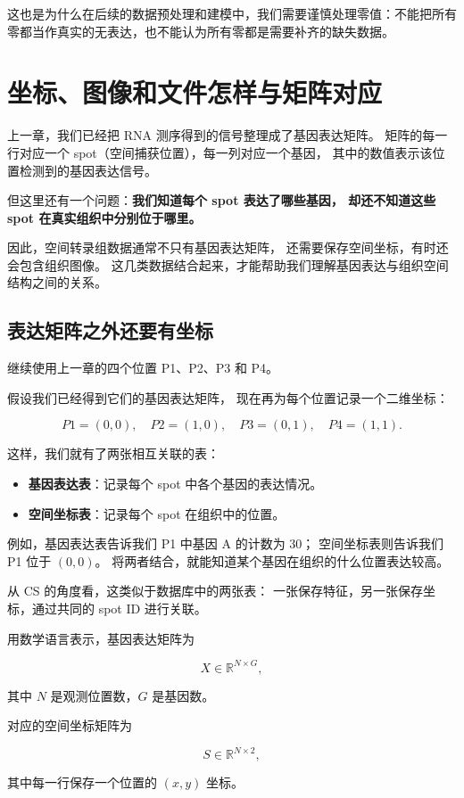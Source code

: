 \documentclass[UTF8,a4paper,11pt,fontset=fandol]{ctexart}
\newcommand{\chapterstart}[1]{\clearpage\section{#1}}
\begin{document}
这也是为什么在后续的数据预处理和建模中，我们需要谨慎处理零值：不能把所有零都当作真实的无表达，也不能认为所有零都是需要补齐的缺失数据。




\clearpage
\endgroup
\chapterstart{坐标、图像和文件怎样与矩阵对应}

上一章，我们已经把 RNA 测序得到的信号整理成了基因表达矩阵。
矩阵的每一行对应一个 spot（空间捕获位置），每一列对应一个基因，
其中的数值表示该位置检测到的基因表达信号。

但这里还有一个问题：\textbf{我们知道每个 spot 表达了哪些基因，
却还不知道这些 spot 在真实组织中分别位于哪里。}

因此，空间转录组数据通常不只有基因表达矩阵，
还需要保存空间坐标，有时还会包含组织图像。
这几类数据结合起来，才能帮助我们理解基因表达与组织空间结构之间的关系。

\subsection{表达矩阵之外还要有坐标}

继续使用上一章的四个位置 P1、P2、P3 和 P4。

假设我们已经得到它们的基因表达矩阵，
现在再为每个位置记录一个二维坐标：

\[
  P1=(0,0),\quad P2=(1,0),\quad
  P3=(0,1),\quad P4=(1,1).
\]

这样，我们就有了两张相互关联的表：

\begin{itemize}
  \item \textbf{基因表达表}：记录每个 spot 中各个基因的表达情况。
  \item \textbf{空间坐标表}：记录每个 spot 在组织中的位置。
\end{itemize}

例如，基因表达表告诉我们 P1 中基因 A 的计数为 30；
空间坐标表则告诉我们 P1 位于 $(0,0)$。
将两者结合，就能知道某个基因在组织的什么位置表达较高。

从 CS 的角度看，这类似于数据库中的两张表：
一张保存特征，另一张保存坐标，通过共同的 spot ID 进行关联。

用数学语言表示，基因表达矩阵为

\[
X\in\mathbb{R}^{N\times G},
\]

其中 $N$ 是观测位置数，$G$ 是基因数。

对应的空间坐标矩阵为

\[
S\in\mathbb{R}^{N\times 2},
\]

其中每一行保存一个位置的 $(x,y)$ 坐标。
\end{document}
